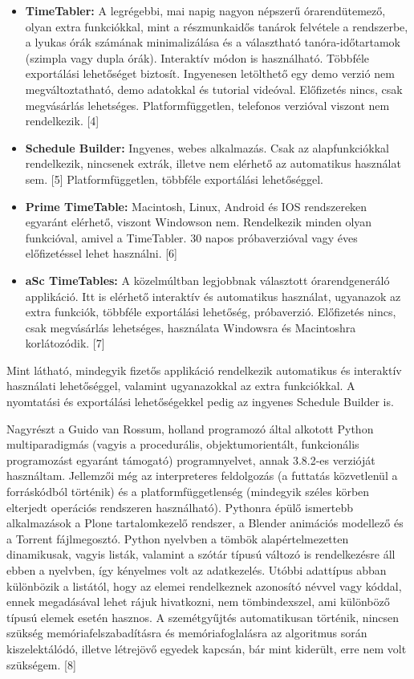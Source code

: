 \begin{itemize}
	\item \textbf{TimeTabler:} A legrégebbi, mai napig nagyon népszerű órarendütemező, olyan extra funkciókkal,
	mint a részmunkaidős tanárok felvétele a rendszerbe, a lyukas órák számának minimalizálása és a választható
	tanóra-időtartamok (szimpla vagy dupla órák). Interaktív módon is használható. Többféle exportálási lehetőséget biztosít.
	Ingyenesen letölthető egy demo verzió nem megváltoztatható, demo adatokkal és 
	tutorial videóval. Előfizetés nincs, csak megvásárlás lehetséges. 
	Platformfüggetlen, telefonos verzióval viszont nem rendelkezik. [4]
	\item \textbf{Schedule Builder:} Ingyenes, webes alkalmazás. Csak az alapfunkciókkal rendelkezik,
	nincsenek extrák, illetve nem elérhető az automatikus használat sem. [5]
	Platformfüggetlen, többféle exportálási lehetőséggel.
	\item \textbf{Prime TimeTable:} Macintosh, Linux, Android és IOS rendszereken egyaránt elérhető, viszont
	Windowson nem. Rendelkezik minden olyan funkcióval, amivel a TimeTabler. 30 napos próbaverzióval vagy éves
	előfizetéssel lehet használni. [6]
	\item \textbf{aSc TimeTables:} A közelmúltban legjobbnak választott órarendgeneráló applikáció. Itt is elérhető interaktív és
	automatikus használat, ugyanazok az extra funkciók, többféle exportálási lehetőség, próbaverzió. Előfizetés nincs, csak
	megvásárlás lehetséges, használata Windowsra és Macintoshra korlátozódik. [7]
\end{itemize}

Mint látható, mindegyik fizetős applikáció rendelkezik automatikus és interaktív használati
lehetőséggel, valamint ugyanazokkal az extra funkciókkal. A nyomtatási és exportálási lehetőségekkel
pedig az ingyenes Schedule Builder is. 



Nagyrészt a Guido van Rossum, holland programozó által alkotott Python multiparadigmás 
(vagyis a procedurális, objektumorientált, funkcionális programozást egyaránt támogató)
programnyelvet, annak 3.8.2-es verzióját használtam. Jellemzői még az interpreteres 
feldolgozás (a futtatás közvetlenül a forráskódból történik) és a platformfüggetlenség 
(mindegyik széles körben elterjedt operációs rendszeren használható). Pythonra épülő
ismertebb alkalmazások a Plone tartalomkezelő rendszer, a Blender animációs modellező
és a Torrent fájlmegosztó. Python nyelvben a tömbök alapértelmezetten dinamikusak, vagyis
listák, valamint a szótár típusú változó is rendelkezésre áll ebben a nyelvben, így 
kényelmes volt az adatkezelés. Utóbbi adattípus abban különbözik a listától, hogy az 
elemei rendelkeznek azonosító névvel vagy kóddal, ennek megadásával lehet rájuk hivatkozni, 
nem tömbindexszel, ami különböző típusú elemek esetén hasznos. A szemétgyűjtés 
automatikusan történik, nincsen szükség memóriafelszabadításra és memóriafoglalásra az 
algoritmus során kiszelektálódó, illetve létrejövő egyedek kapcsán, bár mint kiderült,
erre nem volt szükségem. [8]

